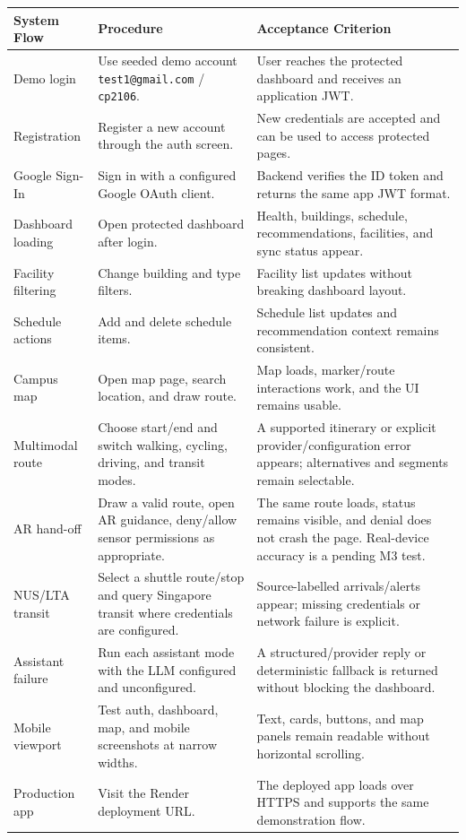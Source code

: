 \documentclass[11pt]{article}
\begin{document}
\begin{center}
\renewcommand{\arraystretch}{1.35}
\begin{tabularx}{\textwidth}{|L{0.25\textwidth}|L{0.32\textwidth}|X|}
\hline
\textbf{System Flow} & \textbf{Procedure} & \textbf{Acceptance Criterion} \\
\hline
Demo login & Use seeded demo account \texttt{test1@gmail.com} / \texttt{cp2106}. & User reaches the protected dashboard and receives an application JWT. \\
\hline
Registration & Register a new account through the auth screen. & New credentials are accepted and can be used to access protected pages. \\
\hline
Google Sign-In & Sign in with a configured Google OAuth client. & Backend verifies the ID token and returns the same app JWT format. \\
\hline
Dashboard loading & Open protected dashboard after login. & Health, buildings, schedule, recommendations, facilities, and sync status appear. \\
\hline
Facility filtering & Change building and type filters. & Facility list updates without breaking dashboard layout. \\
\hline
Schedule actions & Add and delete schedule items. & Schedule list updates and recommendation context remains consistent. \\
\hline
Campus map & Open map page, search location, and draw route. & Map loads, marker/route interactions work, and the UI remains usable. \\
\hline
Multimodal route & Choose start/end and switch walking, cycling, driving, and transit modes. & A supported itinerary or explicit provider/configuration error appears; alternatives and segments remain selectable. \\
\hline
AR hand-off & Draw a valid route, open AR guidance, deny/allow sensor permissions as appropriate. & The same route loads, status remains visible, and denial does not crash the page. Real-device accuracy is a pending M3 test. \\
\hline
NUS/LTA transit & Select a shuttle route/stop and query Singapore transit where credentials are configured. & Source-labelled arrivals/alerts appear; missing credentials or network failure is explicit. \\
\hline
Assistant failure & Run each assistant mode with the LLM configured and unconfigured. & A structured/provider reply or deterministic fallback is returned without blocking the dashboard. \\
\hline
Mobile viewport & Test auth, dashboard, map, and mobile screenshots at narrow widths. & Text, cards, buttons, and map panels remain readable without horizontal scrolling. \\
\hline
Production app & Visit the Render deployment URL. & The deployed app loads over HTTPS and supports the same demonstration flow. \\
\hline
\end{tabularx}
\end{center}
\end{document}
